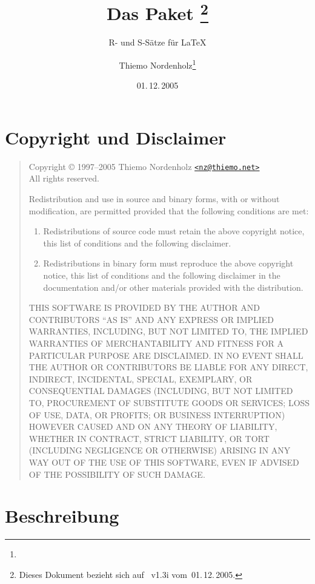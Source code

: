\documentclass[german, pagesize=auto, fontsize=12pt, headings=normal]{scrartcl}
\title{Das Paket \pkg{r\_und\_s}\thanks{Dieses Dokument bezieht sich auf \pkg{r\_und\_s.sty}~v1.3i vom~01.\,12.\,2005.}}
\subtitle{R- und S-Sätze für \LaTeX}
\author{Thiemo Nordenholz\thanks{\mail{nz@thiemo.net}}}
\date{01.\,12.\,2005}
\newcommand*{\bmail}[1]{\href{mailto:#1}{\texttt{<#1>}}}
\begin{document}
\maketitle
\tableofcontents


\section{Copyright und Disclaimer}

\begin{quote}
  \footnotesize
  Copyright © 1997–2005 Thiemo Nordenholz \bmail{nz@thiemo.net} \\
  All rights reserved.

  Redistribution and use in source and binary forms, with or without
  modification, are permitted provided that the following conditions
  are met:
  \begin{enumerate}
  \item Redistributions of source code must retain the above copyright
    notice, this list of conditions and the following disclaimer.
  \item Redistributions in binary form must reproduce the above copyright
    notice, this list of conditions and the following disclaimer in the
    documentation and/or other materials provided with the distribution.
  \end{enumerate}

  \lsstyle
  THIS SOFTWARE IS PROVIDED BY THE AUTHOR AND CONTRIBUTORS ``AS IS'' AND
  ANY EXPRESS OR IMPLIED WARRANTIES, INCLUDING, BUT NOT LIMITED TO, THE
  IMPLIED WARRANTIES OF MERCHANTABILITY AND FITNESS FOR A PARTICULAR PURPOSE
  ARE DISCLAIMED\@.  IN NO EVENT SHALL THE AUTHOR OR CONTRIBUTORS BE LIABLE
  FOR ANY DIRECT, INDIRECT, INCIDENTAL, SPECIAL, EXEMPLARY, OR CONSEQUENTIAL
  DAMAGES (INCLUDING, BUT NOT LIMITED TO, PROCUREMENT OF SUBSTITUTE GOODS
  OR SERVICES; LOSS OF USE, DATA, OR PROFITS; OR BUSINESS INTERRUPTION)
  HOWEVER CAUSED AND ON ANY THEORY OF LIABILITY, WHETHER IN CONTRACT, STRICT
  LIABILITY, OR TORT (INCLUDING NEGLIGENCE OR OTHERWISE) ARISING IN ANY WAY
  OUT OF THE USE OF THIS SOFTWARE, EVEN IF ADVISED OF THE POSSIBILITY OF
  SUCH DAMAGE.%
\end{quote}


\section{Beschreibung}
\end{document}
